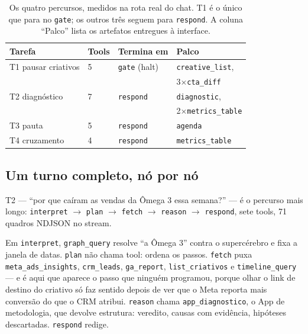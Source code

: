 \documentclass[10pt,twocolumn]{article}
\newcommand{\code}[1]{\texttt{\footnotesize #1}}
\begin{document}
\begin{table}[t]
\centering
\footnotesize
\caption{Os quatro percursos, medidos na rota real do chat. T1 é o único que para no
\code{gate}; os outros três seguem para \code{respond}. A coluna ``Palco'' lista os
artefatos entregues à interface.}
\label{tab:percursos}
\setlength{\tabcolsep}{4pt}
\begin{tabular}{@{}llll@{}}
\toprule
Tarefa & Tools & Termina em & Palco \\
\midrule
T1 pausar criativos & 5 & \code{gate} (halt) & \code{creative\_list}, \\
                    &   &                    & 3$\times$\code{cta\_diff} \\
T2 diagnóstico      & 7 & \code{respond}     & \code{diagnostic}, \\
                    &   &                    & 2$\times$\code{metrics\_table} \\
T3 pauta            & 5 & \code{respond}     & \code{agenda} \\
T4 cruzamento       & 4 & \code{respond}     & \code{metrics\_table} \\
\bottomrule
\end{tabular}
\end{table}

\subsection{Um turno completo, nó por nó}

T2 --- ``por que caíram as vendas da Ômega 3 essa semana?'' --- é o percurso mais longo:
\code{interpret} $\rightarrow$ \code{plan} $\rightarrow$ \code{fetch} $\rightarrow$
\code{reason} $\rightarrow$ \code{respond}, sete tools, 71 quadros NDJSON no stream.

Em \code{interpret}, \code{graph\_query} resolve ``a Ômega 3'' contra o supercérebro e fixa
a janela de datas. \code{plan} não chama tool: ordena os passos. \code{fetch} puxa
\code{meta\_ads\_insights}, \code{crm\_leads}, \code{ga\_report}, \code{list\_criativos} e
\code{timeline\_query} --- e é aqui que aparece o passo que ninguém programou, porque olhar
o link de destino do criativo só faz sentido depois de ver que o Meta reporta mais conversão
do que o CRM atribui. \code{reason} chama \code{app\_diagnostico}, o App de metodologia, que
devolve estrutura: veredito, causas com evidência, hipóteses descartadas. \code{respond}
redige.
\end{document}
